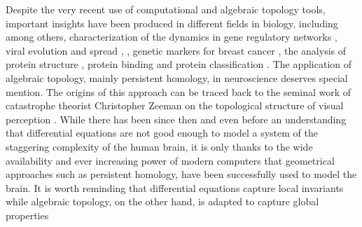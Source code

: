 \documentclass[onecollarge,runningheads]{svjour2}
\begin{document}
Despite the very recent use of computational and algebraic topology tools, important insights have been produced in different fields in biology, including among others, characterization of the dynamics in gene regulatory networks \cite{boczko2005structure}, viral evolution and spread \cite{chan2013topology}, \cite{taylor2015topological}, genetic markers for breast cancer \cite{nicolau2011topology}, the analysis of protein structure \cite{xia2014persistent}, protein binding \cite{kovacev2016using} and protein classification \cite{cang2015topological}.
The application of algebraic topology, mainly persistent homology, in neuroscience deserves special mention. The origins of this approach can be traced back to the seminal work of catastrophe theorist Christopher Zeeman on the topological structure of visual perception \cite{zeeman:1962}. While there has been since then and even before an understanding that differential equations are not good enough to model a system of the staggering complexity of the human brain, it is only thanks to the wide availability and ever increasing power of modern computers that geometrical approaches such as persistent homology, have been successfully used to model the brain. It is worth reminding that differential equations capture local invariants while algebraic topology, on the other hand, is adapted to capture global properties \cite{hoffman1966lie} 
\end{document}
